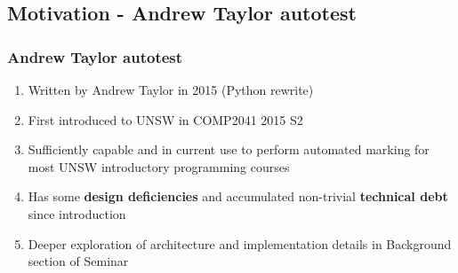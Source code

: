 \documentclass[xcolor]{beamer}
\begin{document}
\subsection{Motivation - Andrew Taylor autotest}
\begin{frame}
	\frametitle{Andrew Taylor autotest}
	\begin{enumerate}
		\setlength\itemsep{1em}
		\item Written by Andrew Taylor in 2015 (Python rewrite)
			\pause
		\item First introduced to UNSW in COMP2041 2015 S2
			\pause
		\item Sufficiently capable and in current use to perform automated marking for most UNSW introductory programming courses
			\pause
		\item Has some \textbf{design deficiencies} and accumulated non-trivial \textbf{technical debt} since introduction
			\pause
		\item Deeper exploration of architecture and implementation details in Background section of Seminar
	\end{enumerate}
\end{frame}
\end{document}
